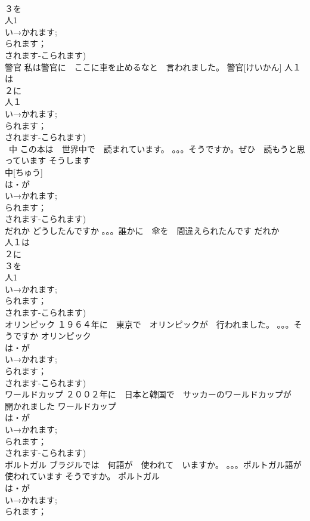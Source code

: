 \documentclass[8pt]{extreport}
\begin{document}
\begin{CJK}{UTF8}{min}
\\	３を　
\\	人1 
\\	い→かれます;
\\	られます；
\\	されます-こられます)
\\	警官	私は警官に　ここに車を止めるなと　言われました。	警官[けいかん]				人１は
\\	２に
\\	人１
\\	い→かれます;
\\	られます；
\\	されます-こられます)
\\	~中	この本は　世界中で　読まれています。 。。。そうですか。ぜひ　読もうと思っています そうします	
\\	中[ちゅう]			
\\	は・が
\\	い→かれます;
\\	られます；
\\	されます-こられます)
\\	だれか	どうしたんですか 。。。誰かに　傘を　間違えられたんです	だれか			
\\	人１は　
\\	２に　
\\	３を　
\\	人1 
\\	い→かれます;
\\	られます；
\\	されます-こられます)
\\	オリンピック	１９６４年に　東京で　オリンピックが　行われました。 。。。そうですか	オリンピック				
\\	は・が
\\	い→かれます;
\\	られます；
\\	されます-こられます)
\\	ワールドカップ	２００２年に　日本と韓国で　サッカーのワールドカップが　開かれました	ワールドカップ				
\\	は・が
\\	い→かれます;
\\	られます；
\\	されます-こられます)
\\	ポルトガル	ブラジルでは　何語が　使われて　いますか。 。。。ポルトガル語が　使われています そうですか。	ポルトガル			
\\	は・が
\\	い→かれます;
\\	られます；

\end{CJK}
\end{document}
